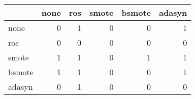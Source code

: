 \begin{tabular}{lrrrrr}
\hline
        &   none &   ros &   smote &   bsmote &   adasyn \\
\hline
 none   &      0 &     1 &       0 &        0 &        1 \\
 ros    &      0 &     0 &       0 &        0 &        0 \\
 smote  &      1 &     1 &       0 &        1 &        1 \\
 bsmote &      1 &     1 &       0 &        0 &        1 \\
 adasyn &      0 &     1 &       0 &        0 &        0 \\
\hline
\end{tabular}